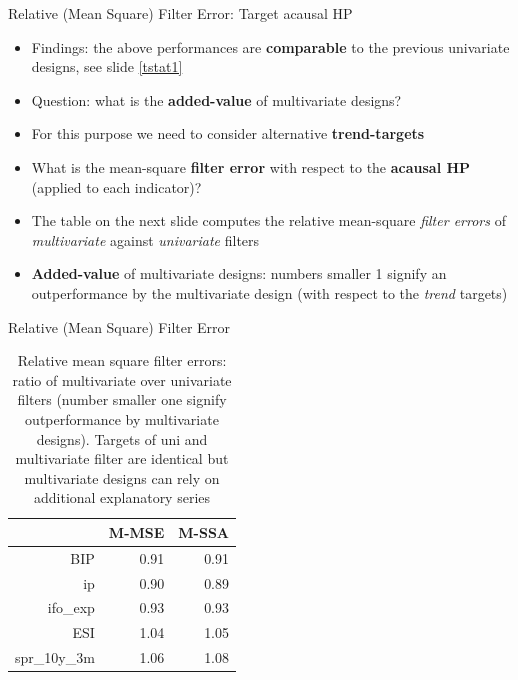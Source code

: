\documentclass{beamer}
\begin{document}
\begin{frame} {Relative (Mean Square) Filter Error: Target acausal HP}
\begin{itemize}
\item Findings: the above performances are \textbf{comparable} to the previous univariate designs, see slide \eqref{tstat1}
\item Question: what is the \textbf{added-value} of multivariate designs?
\item For this purpose we need to consider {alternative} \textbf{trend-targets}
\item What is the mean-square \textbf{filter error} with respect to the \textbf{acausal HP} (applied to each indicator)?
\item The table on the next slide computes the relative mean-square \emph{filter errors} of \emph{multivariate} against \emph{univariate} filters
\item \textbf{Added-value} of multivariate designs: numbers smaller 1 signify an outperformance by the  multivariate design (with respect to the \emph{trend} targets)
\end{itemize}
\end{frame}



\begin{frame} {Relative (Mean Square) Filter Error}\label{rfmse1}


\begin{table}[ht]
\centering
\begin{tabular}{rrr}
  \hline
 & M-MSE & M-SSA \\ 
  \hline
BIP & 0.91 & 0.91 \\ 
  ip & 0.90 & 0.89 \\ 
  ifo\_exp & 0.93 & 0.93 \\ 
  ESI & 1.04 & 1.05 \\ 
  spr\_10y\_3m & 1.06 & 1.08 \\ 
   \hline
\end{tabular}
\caption{Relative mean square filter errors: ratio of multivariate over univariate filters (number smaller one signify outperformance by multivariate designs). Targets of uni and multivariate filter are identical but multivariate designs can rely on additional explanatory series} 
\label{perf_var1}
\end{table}
\end{frame}
\end{document}
